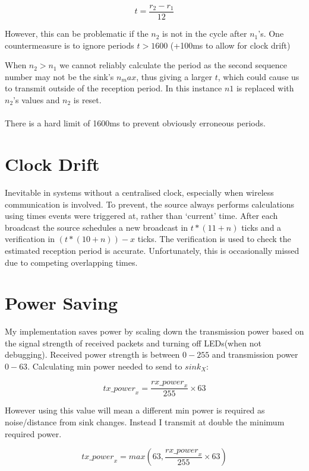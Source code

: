 \documentclass{article}
\begin{document}
$$t = \frac{r_2 -r_1} {12}$$

However, this can be problematic if the $n_2$ is not in the cycle after $n_1$'s. One countermeasure is to ignore
periods $t > 1600$ (+100ms to allow for clock drift)


When $n_2 > n_1$ we cannot reliably calculate the period as the second
sequence number may not be the sink's $n_max$, thus giving a larger $t$, which could cause us to transmit outside
of the reception period. In this instance $n1$ is replaced with $n_2$'s values and $n_2$ is reset.

\paragraph{}
There is a hard limit of 1600ms to prevent obviously erroneous periods.

\section{Clock Drift}

Inevitable in systems without a centralised clock, especially when wireless communication is involved.
To prevent, the source always performs calculations using times events were triggered at, rather than 
`current' time. After each broadcast the source schedules a new broadcast in $t * (11 + n)$ ticks and a verification in 
$(t * (10 + n)) - x$ ticks. The verification is used to check the estimated reception period is accurate.
Unfortunately, this is occasionally missed due to competing overlapping times.

\section{Power Saving}

My implementation saves power by scaling down the transmission power based on the signal strength of received packets and turning
off LEDs(when not debugging).
Received power strength is between $0-255$ and transmission power $0-63$. Calculating min power needed to send to $sink_X$:

$$
\mathit{tx\_power}_x = \frac{\mathit{rx\_power}_x} {255} \times 63
$$

However using this value will mean a different min power is required as noise/distance from sink changes. 
Instead I transmit at double the minimum required power.

$$
\mathit{tx\_power}_x = max(63, \frac{\mathit{rx\_power}_x} {255} \times 63)
$$
\end{document}

